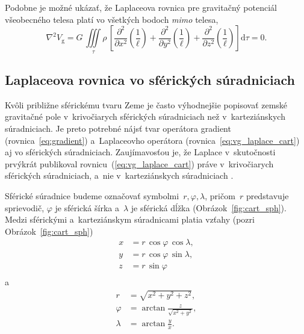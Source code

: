 \documentclass[a4paper, 12pt]{book}
\newcommand{\diff}{\mathrm d}
\newcommand{\gidx}{\mathrm g}
\begin{document}
Podobne je možné ukázať, že Laplaceova rovnica pre gravitačný potenciál 
všeobecného telesa platí vo všetkých bodoch \emph{mimo} telesa,
%
\begin{equation}
\nabla^2 V_\gidx = G\, \iiint\limits_\tau \rho \, \left[ 
\frac{\partial^2}{\partial
x^2}\left(\frac{1}{\ell}\right) + \frac{\partial^2}{\partial
y^2}\left(\frac{1}{\ell}\right) + \frac{\partial^2}{\partial
z^2}\left(\frac{1}{\ell}\right) \right] \diff\tau = 0{.}
\end{equation}


\subsection{Laplaceova rovnica vo sférických súradniciach}
\label{sec:laplace_equation_sph}

Kvôli približne sférickému tvaru Zeme je často výhodnejšie popisovať zemské 
gravitačné pole v~krivočiarych sférických súradniciach než v~karteziánskych 
súradniciach.  Je preto potrebné nájsť tvar operátora gradient 
(rovnica~\ref{eq:gradient}) a~Laplaceovho operátora 
(rovnica~\ref{eq:vg_laplace_cart}) aj vo sférických súradniciach.  
Zaujímavosťou je, že Laplace v~skutočnosti prvýkrát publikoval 
rovnicu~(\ref{eq:vg_laplace_cart}) práve v~krivočiarych sférických 
súradniciach, a~nie v~karteziánskych súradniciach \parencite{MacMillan1930}.

Sférické súradnice budeme označovať symbolmi~$r, \varphi, \lambda$, pričom~$r$ 
predstavuje sprievodič, $\varphi$ je sférická šírka a~$\lambda$ je sférická 
dĺžka (Obrázok~\ref{fig:cart_sph}).  Medzi sférickými a~karteziánskym 
súradnicami platia vzťahy (pozri Obrázok~\ref{fig:cart_sph})
%
\begin{equation}
\label{eq:sph2cart}
\begin{split}
x &= r \, \cos\varphi \, \cos\lambda{,}\\
y &= r \, \cos\varphi \, \sin\lambda{,}\\
z &= r \, \sin\varphi\\
\end{split}
\end{equation}
%
a
%
\begin{equation}
\label{eq:cart2sph}
\begin{split}
r &= \sqrt{x^2 + y^2 + z^2}{,}\\
\varphi &= \arctan \frac{z}{\sqrt{x^2 + y^2}}{,}\\
\lambda &= \arctan \frac{y}{x}{.}\\
\end{split}
\end{equation}
\end{document}
